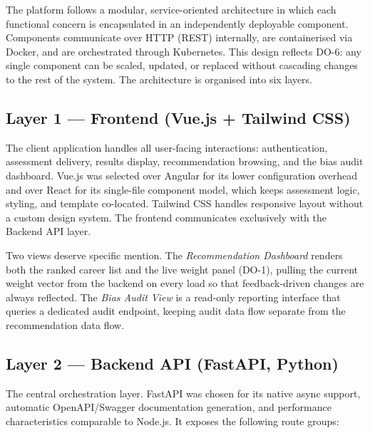 The platform follows a modular, service-oriented architecture in which each
functional concern is encapsulated in an independently deployable component.
Components communicate over HTTP (REST) internally, are containerised via
Docker, and are orchestrated through Kubernetes. This design reflects DO-6:
any single component can be scaled, updated, or replaced without cascading
changes to the rest of the system. The architecture is organised into six layers.

\subsection*{Layer 1 --- Frontend (Vue.js + Tailwind CSS)}

The client application handles all user-facing interactions: authentication,
assessment delivery, results display, recommendation browsing, and the bias
audit dashboard. Vue.js was selected over Angular for its lower configuration
overhead and over React for its single-file component model, which keeps
assessment logic, styling, and template co-located. Tailwind CSS handles
responsive layout without a custom design system. The frontend communicates
exclusively with the Backend API layer.

Two views deserve specific mention. The \emph{Recommendation Dashboard} renders
both the ranked career list and the live weight panel (DO-1), pulling the
current weight vector from the backend on every load so that feedback-driven
changes are always reflected. The \emph{Bias Audit View} is a read-only
reporting interface that queries a dedicated audit endpoint, keeping audit data
flow separate from the recommendation data flow.

\subsection*{Layer 2 --- Backend API (FastAPI, Python)}

The central orchestration layer. FastAPI was chosen for its native async
support, automatic OpenAPI/Swagger documentation generation, and performance
characteristics comparable to Node.js. It exposes the following route groups:

